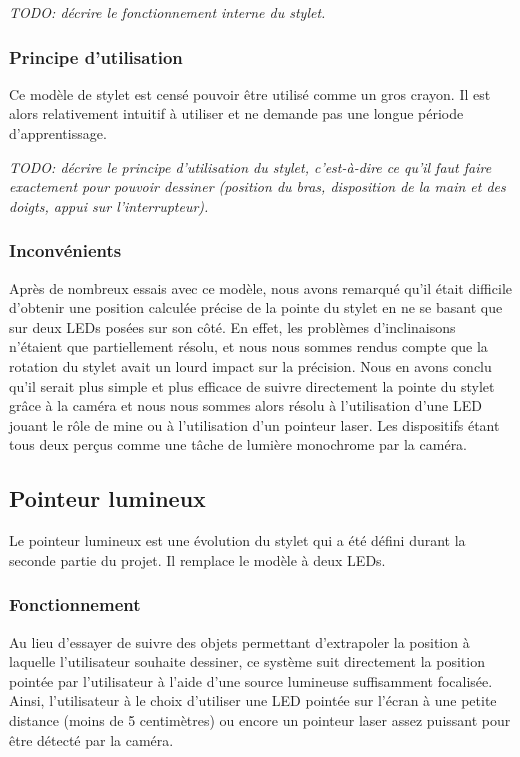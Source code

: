 \documentclass[11pt,a4paper,oldfontcommands]{memoir}
\begin{document}
\textit{TODO: décrire le fonctionnement interne du stylet.}

\subsubsection{Principe d'utilisation}

Ce modèle de stylet est censé pouvoir être utilisé comme un gros crayon. Il est alors relativement intuitif à utiliser et ne demande pas une longue période d'apprentissage.

\textit{TODO: décrire le principe d'utilisation du stylet, c'est-à-dire ce qu'il faut faire exactement pour pouvoir dessiner (position du bras, disposition de la main et des doigts, appui sur l'interrupteur).}

\subsubsection{Inconvénients}
Après de nombreux essais avec ce modèle, nous avons remarqué qu'il était difficile d'obtenir une position calculée précise de la pointe du stylet en ne se basant que sur deux LEDs posées sur son côté. En effet, les problèmes d'inclinaisons n'étaient que partiellement résolu, et nous nous sommes rendus compte que la rotation du stylet avait un lourd impact sur la précision.
Nous en avons conclu qu'il serait plus simple et plus efficace de suivre directement la pointe du stylet grâce à la caméra et nous nous sommes alors résolu à l'utilisation d'une LED jouant le rôle de mine ou à l'utilisation d'un pointeur laser. Les dispositifs étant tous deux perçus comme une tâche de lumière monochrome par la caméra.

\newpage

\subsection{Pointeur lumineux}

Le pointeur lumineux est une évolution du stylet qui a été défini durant la seconde partie du projet. Il remplace le modèle à deux LEDs.

\subsubsection{Fonctionnement}

Au lieu d'essayer de suivre des objets permettant d'extrapoler la position à laquelle l'utilisateur souhaite dessiner, ce système suit directement la position pointée par l'utilisateur à l'aide d'une source lumineuse suffisamment focalisée.
Ainsi, l'utilisateur à le choix d'utiliser une LED pointée sur l'écran à une petite distance (moins de 5 centimètres) ou encore un pointeur laser assez puissant pour être détecté par la caméra.
\end{document}
